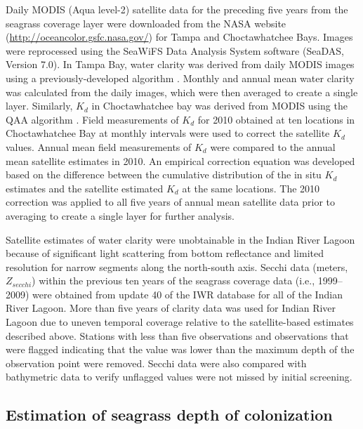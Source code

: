 \documentclass[letterpaper,12pt,oneside]{article}\usepackage[]{graphicx}\usepackage[]{color}
\begin{document}
Daily MODIS (Aqua level-2) satellite data for the preceding five years from the seagrass coverage layer were downloaded from the NASA website (\url{http://oceancolor.gsfc.nasa.gov/}) for Tampa and Choctawhatchee Bays. Images were reprocessed using the SeaWiFS Data Analysis System software (SeaDAS, Version 7.0). In Tampa Bay, water clarity was derived from daily MODIS images using a previously-developed algorithm \citep{Chen07}. Monthly and annual mean water clarity was calculated from the daily images, which were then averaged to create a single layer. Similarly, $K_d$ in Choctawhatchee bay was derived from MODIS using the QAA algorithm \citep{Lee05}.  Field measurements of $K_d$ for 2010 obtained at ten locations in Choctawhatchee Bay at monthly intervals were used to correct the satellite $K_d$ values.  Annual mean field measurements of $K_d$ were compared to the annual mean satellite estimates in 2010.  An empirical correction equation was developed based on the difference between the cumulative distribution of the in situ $K_d$ estimates and the satellite estimated $K_d$ at the same locations.  The 2010 correction was applied to all five years of annual mean satellite data prior to averaging to create a single layer for further analysis.

Satellite estimates of water clarity were unobtainable in the Indian River Lagoon because of significant light scattering from bottom reflectance and limited resolution for narrow segments along the north-south axis.  Secchi data (meters, $Z_{secchi}$) within the previous ten years of the seagrass coverage data (i.e., 1999--2009) were obtained from update 40 of the \ac{IWR} database for all of the Indian River Lagoon.  More than five years of clarity data was used for Indian River Lagoon due to uneven temporal coverage relative to the satellite-based estimates described above.  Stations with less than five observations and observations that were flagged indicating that the value was lower than the maximum depth of the observation point were removed.  Secchi data were also compared with bathymetric data to verify unflagged values were not missed by initial screening. 

\subsection{Estimation of seagrass depth of colonization} \label{sec:est_method}
\end{document}

